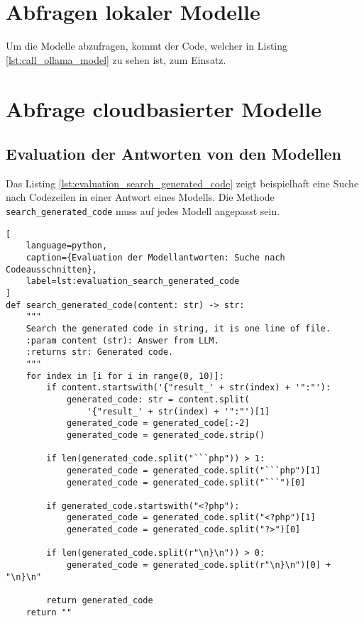 \newpage
\section{Abfragen lokaler Modelle}
Um die Modelle abzufragen, kommt der Code, welcher in Listing \ref{lst:call_ollama_model} zu sehen ist, zum Einsatz.



\newpage
\section{Abfrage cloudbasierter Modelle}






\subsection{Evaluation der Antworten von den Modellen}
Das Listing \ref{lst:evaluation_search_generated_code} zeigt beispielhaft eine Suche nach Codezeilen in einer Antwort eines Modells. Die Methode \texttt{search\_generated\_code} muss auf jedes Modell angepasst sein.

\begin{lstlisting}[
	language=python,
	caption={Evaluation der Modellantworten: Suche nach Codeausschnitten},
	label=lst:evaluation_search_generated_code
]
def search_generated_code(content: str) -> str:
    """
    Search the generated code in string, it is one line of file.
    :param content (str): Answer from LLM.
    :returns str: Generated code.
    """
    for index in [i for i in range(0, 10)]:
        if content.startswith('{"result_' + str(index) + '":"'):
            generated_code: str = content.split(
                '{"result_' + str(index) + '":"')[1]
            generated_code = generated_code[:-2]
            generated_code = generated_code.strip()

        if len(generated_code.split("```php")) > 1:
            generated_code = generated_code.split("```php")[1]
            generated_code = generated_code.split("```")[0]

        if generated_code.startswith("<?php"):
            generated_code = generated_code.split("<?php")[1]
            generated_code = generated_code.split("?>")[0]

        if len(generated_code.split(r"\n}\n")) > 0:
            generated_code = generated_code.split(r"\n}\n")[0] + "\n}\n"

        return generated_code
    return ""
\end{lstlisting}


